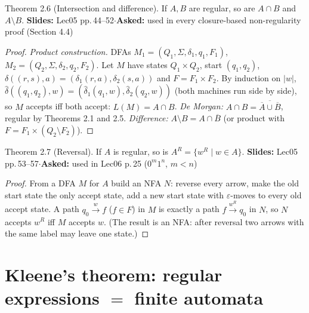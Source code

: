 \documentclass[10.5pt,a4paper]{article}
\newcommand{\src}[2]{{\footnotesize\color{gray!70!black}\textbf{Slides:} #1\enspace$\cdot$\enspace\textbf{Asked:} #2}\par}
\newcommand{\eps}{\varepsilon}
\newcommand{\dhat}{\hat{\delta}}
\begin{document}
\begin{thm}{Theorem 2.6 (Intersection and difference). If $A,B$ are regular, so are $A\cap B$ and $A\setminus B$.}
\src{Lec05 pp.\,44--52}{used in every closure-based non-regularity proof (Section 4.4)}
\end{thm}
\begin{proof}
\emph{Product construction.} DFAs $M_1=(Q_1,\Sigma,\delta_1,q_1,F_1)$, $M_2=(Q_2,\Sigma,\delta_2,q_2,F_2)$. Let $M$ have states $Q_1\times Q_2$,
start $(q_1,q_2)$, $\delta((r,s),a)=(\delta_1(r,a),\delta_2(s,a))$ and $F=F_1\times F_2$. By induction on $|w|$,
$\dhat((q_1,q_2),w)=(\dhat_1(q_1,w),\dhat_2(q_2,w))$ (both machines run side by side), so $M$ accepts iff both accept: $L(M)=A\cap B$.
\emph{De Morgan:} $A\cap B=\overline{\overline A\cup\overline B}$, regular by Theorems 2.1 and 2.5.
\emph{Difference:} $A\setminus B=A\cap\overline B$ (or product with $F=F_1\times(Q_2\setminus F_2)$).
\end{proof}

\begin{thm}{Theorem 2.7 (Reversal). If $A$ is regular, so is $A^R=\{w^R\mid w\in A\}$.}
\src{Lec05 pp.\,53--57}{used in Lec06 p.\,25 ($0^m1^n$, $m<n$)}
\end{thm}
\begin{proof}
From a DFA $M$ for $A$ build an NFA $N$: reverse every arrow, make the old start state the only accept state, add a new start state with
$\eps$-moves to every old accept state. A path $q_0\xrightarrow{w}f$ ($f\in F$) in $M$ is exactly a path $f\xrightarrow{w^R}q_0$ in $N$, so $N$
accepts $w^R$ iff $M$ accepts $w$. (The result is an NFA: after reversal two arrows with the same label may leave one state.)
\end{proof}

\section{Kleene's theorem: regular expressions $=$ finite automata}
\end{document}
